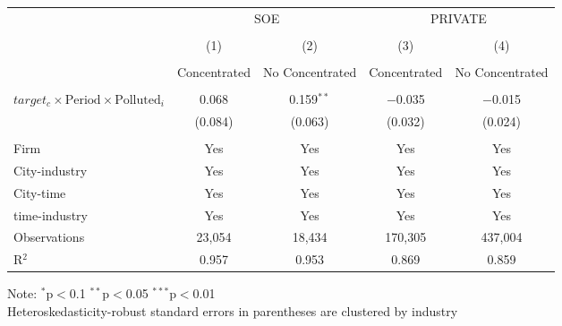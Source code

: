 \documentclass[12pt]{article}
\begin{document}
\begin{table}[!htb]
\begin{adjustbox}{width=\textwidth, totalheight=\baselineskip,keepaspectratio}
\begin{tabular}{@{\extracolsep{5pt}}lcccc}
\\[-1.8ex]
            &\multicolumn{2}{c}{SOE}&\multicolumn{2}{c}{PRIVATE}\\
\\[-1.8ex] & (1) & (2) & (3) & (4)\\
 \\[-1.8ex]& Concentrated & No Concentrated & Concentrated & No Concentrated\\
 \hline \\[-1.8ex] 
   $target_c \times \text{Period} \times \text{Polluted}_i$  & 0.068 & 0.159$^{**}$ & $-$0.035 & $-$0.015 \\ 
  & (0.084) & (0.063) & (0.032) & (0.024) \\ 
 \hline \\[-1.8ex] 
Firm & Yes & Yes & Yes & Yes \\ 
City-industry & Yes & Yes & Yes & Yes \\ 
City-time & Yes & Yes & Yes & Yes \\ 
time-industry & Yes & Yes & Yes & Yes \\ 
Observations & 23,054 & 18,434 & 170,305 & 437,004 \\ 
R$^{2}$ & 0.957 & 0.953 & 0.869 & 0.859 \\ 
    \end{tabular}
    \end{adjustbox}
    \begin{tablenotes}
      \small
      \item 
      Note: $^{*}$p$<$0.1 $^{**}$p$<$0.05 $^{***}$p$<$0.01 \\
      Heteroskedasticity-robust standard errors in parentheses are clustered by industry
    \end{tablenotes}
\end{table}
\end{document}
